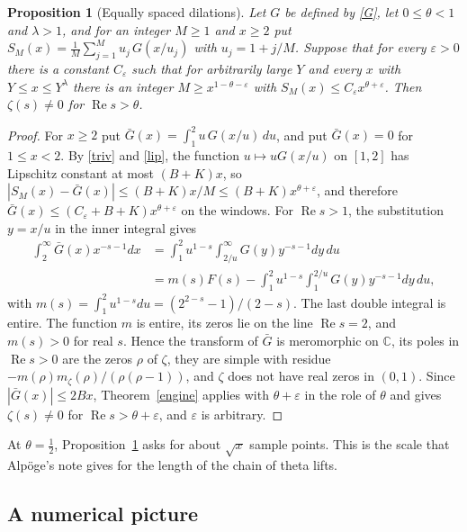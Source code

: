 \documentclass[11pt,letterpaper]{article}
\newtheorem{proposition}[theorem]{Proposition}
\numberwithin{equation}{section}
\begin{document}
\begin{proposition}[Equally spaced dilations]\label{dil}
Let $G$ be defined by \eqref{G}, let $0\le\theta<1$ and $\lambda>1$, and for an integer $M\ge1$ and $x\ge2$ put $S_M(x)=\frac1M\sum_{j=1}^Mu_j\,G(x/u_j)$ with $u_j=1+j/M$. Suppose that for every $\varepsilon>0$ there is a constant $C_\varepsilon$ such that for arbitrarily large $Y$ and every $x$ with $Y\le x\le Y^\lambda$ there is an integer $M\ge x^{1-\theta-\varepsilon}$ with $S_M(x)\le C_\varepsilon x^{\theta+\varepsilon}$. Then $\zeta(s)\ne0$ for $\operatorname{Re}s>\theta$.
\end{proposition}
\begin{proof}
For $x\ge2$ put $\bar G(x)=\int_1^2u\,G(x/u)\,du$, and put $\bar G(x)=0$ for $1\le x<2$. By \eqref{triv} and \eqref{lip}, the function $u\mapsto uG(x/u)$ on $[1,2]$ has Lipschitz constant at most $(B+K)x$, so $|S_M(x)-\bar G(x)|\le(B+K)x/M\le(B+K)x^{\theta+\varepsilon}$, and therefore $\bar G(x)\le(C_\varepsilon+B+K)x^{\theta+\varepsilon}$ on the windows. For $\operatorname{Re}s>1$, the substitution $y=x/u$ in the inner integral gives
\begin{align*}
\int_2^\infty\bar G(x)x^{-s-1}dx&=\int_1^2u^{1-s}\!\int_{2/u}^\infty G(y)y^{-s-1}dy\,du\\
&=m(s)F(s)-\int_1^2u^{1-s}\!\int_1^{2/u}G(y)y^{-s-1}dy\,du,
\end{align*}
with $m(s)=\int_1^2u^{1-s}du=(2^{2-s}-1)/(2-s)$. The last double integral is entire. The function $m$ is entire, its zeros lie on the line $\operatorname{Re}s=2$, and $m(s)>0$ for real $s$. Hence the transform of $\bar G$ is meromorphic on $\mathbb C$, its poles in $\operatorname{Re}s>0$ are the zeros $\rho$ of $\zeta$, they are simple with residue $-m(\rho)m_\zeta(\rho)/(\rho(\rho-1))$, and $\zeta$ does not have real zeros in $(0,1)$. Since $|\bar G(x)|\le2Bx$, Theorem~\ref{engine} applies with $\theta+\varepsilon$ in the role of $\theta$ and gives $\zeta(s)\ne0$ for $\operatorname{Re}s>\theta+\varepsilon$, and $\varepsilon$ is arbitrary.
\end{proof}

At $\theta=\tfrac12$, Proposition~\ref{dil} asks for about $\sqrt x$ sample points. This is the scale that Alp\"oge's note gives for the length of the chain of theta lifts.

\subsection{A numerical picture}
\end{document}

